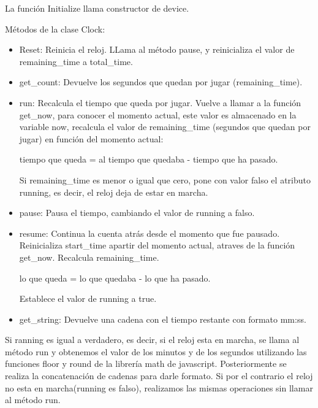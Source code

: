 La función Initialize llama constructor de device.

Métodos de la clase Clock:

\begin{itemize}
 \item Reset: Reinicia el reloj. LLama al método pause, y reinicializa el valor de remaining\_time a total\_time.

 \item get\_count: Devuelve los segundos que quedan por jugar (remaining\_time).

 \item run: Recalcula el tiempo que queda por jugar. Vuelve a llamar a la función get\_now, para conocer el momento actual, este valor es almacenado 
en la variable now, recalcula el valor de remaining\_time (segundos que quedan por jugar) en función del momento actual:

        tiempo que queda = al tiempo que quedaba - tiempo que ha pasado.
        
Si remaining\_time es menor o igual que cero, pone con valor falso el atributo running, es decir, el reloj deja de estar en marcha.

 \item pause: Pausa el tiempo, cambiando el valor de running a falso.

 \item resume: Continua la cuenta atrás desde el momento que fue pausado. Reinicializa start\_time apartir del momento actual, atraves de la 
 función get\_now. Recalcula remaining\_time.

        lo que queda = lo que quedaba - lo que ha pasado.

Establece el valor de running a true.

 \item get\_string: Devuelve una cadena con el tiempo restante con formato mm:ss.
\end{itemize}

Si ranning es igual a verdadero, es decir, si el reloj esta en marcha, se llama al método run y obtenemos el valor de los minutos y de los 
segundos utilizando las funciones floor y round de la librería math de javascript. Posteriormente se realiza la concatenación de cadenas para 
darle formato. Si por el contrario el reloj no esta en marcha(running es falso), realizamos las mismas operaciones sin llamar al método run.

